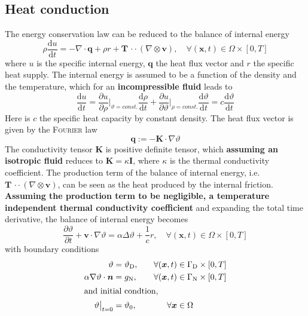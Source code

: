 \documentclass[]{scrartcl}
\newcommand{\pfrac}[2]{\frac{\partial #1}{\partial #2}}
\newcommand{\tdfrac}[2]{\frac{\mathrm{d} #1}{\mathrm{d} #2}}
\newcommand{\bs}[1]{\boldsymbol{#1}}
\newcommand{\cdott}{\, {\cdot}{\cdot}\,}
\begin{document}
\subsection{Heat conduction}
The energy conservation law can be reduced to the balance of internal energy
\begin{equation}\label{Eqn:InternalEnergie}
	\rho \tdfrac{u}{t} = - \nabla \cdot \bs{q} + \rho r + \bs{T} \cdott (\nabla \otimes \bs{v}), \quad \forall (\bs{x}, t) \in \Omega \times \left[0, T \right]
\end{equation}
where $u$ is the specific internal energy, $\bs{q}$ the heat flux vector and $r$ the specific heat supply. The internal energy is assumed to be a function of the density and the temperature, which for an \textbf{incompressible fluid} leads to
\begin{equation*}
	\tdfrac{u}{t} = \pfrac{u}{\rho}\bigg|_{\vartheta = \textit{const.}}\tdfrac{\rho}{t} + \pfrac{u}{\vartheta}\bigg|_{\rho = \textit{const.}} \tdfrac{\vartheta}{t} = c \tdfrac{\vartheta}{t}
\end{equation*}
Here is $c$ the specific heat capacity by constant density. The heat flux vector is given by the \textsc{Fourier} law
\begin{equation*}
	\bs{q} := - \bs{K} \cdot \nabla \vartheta
\end{equation*}
The conductivity tensor $\bs{K}$ is positive definite tensor, which \textbf{assuming an isotropic fluid} reduces to $\bs{K} = \kappa \bs{I}$, where $\kappa$ is the thermal conductivity coefficient.
The production term of the balance of internal energy, i.e. $\bs{T} \cdott (\nabla \otimes \bs{v})$, can be seen as the heat produced by the internal friction.  \textbf{Assuming the production term to be negligible, a temperature independent thermal conductivity coefficient} and expanding the total time derivative, the balance of internal energy becomes
\begin{equation}\label{Eqn:HeatEquation}
	\pfrac{\vartheta}{t} + \bs{v} \cdot \nabla \vartheta = \alpha \Delta \vartheta + \frac{1}{c} r , \quad \forall (\bs{x}, t) \in \Omega \times \left[0, T \right]
\end{equation}
with boundary conditions
\begin{alignat*}{2}
	\vartheta &= \vartheta_\textrm{D}, \quad& \forall (\bs{x}, t)&\in \Gamma_\textrm{D} \times \left[0, T \right] \\
\alpha \nabla \vartheta \cdot \bs{n} &= g_\textrm{N}, \quad& \forall (\bs{x}, t)&\in \Gamma_\textrm{N} \times \left[0, T \right]\\
\intertext{and initial condtion,} 
{\vartheta}\big|_{t = 0} &= {\vartheta}_0,\quad &\forall {\bs{x}}& \in {\Omega} 
\end{alignat*}
\end{document}
